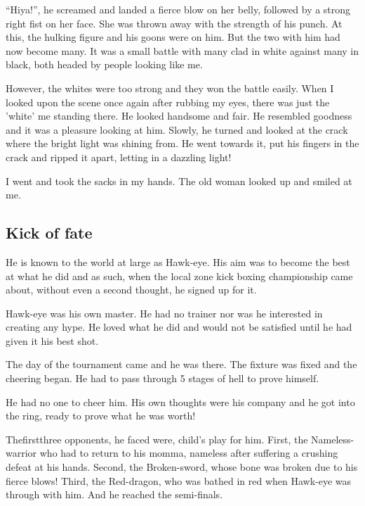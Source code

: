 \documentclass[twoside,11pt]{article}
\begin{document}
``Hiya!'', he screamed and landed a fierce blow on her belly, followed by a strong right fist on her face. She was thrown away with the strength of his punch. At this, the hulking figure and his goons were on him. But the two with him had now become many. It was a small battle with many clad in white against many in black, both headed by people looking like me.

However, the whites were too strong and they won the battle easily. When I looked upon the scene once again after rubbing my eyes, there was just the 'white' me standing there. He looked handsome and fair. He resembled goodness and it was a pleasure looking at him. Slowly, he turned and looked at the crack where the bright light was shining from. He went towards it, put his fingers in the crack and ripped it apart, letting in a dazzling light!

I went and took the sacks in my hands. The old woman looked up and smiled at me.
\newpage

\begin{center}
  \section{Kick of fate}
\end{center}
\bigskip
\bigskip
\bigskip

He is known to the world at large as Hawk-eye. His aim was to become the best at what he did and as such, when the local zone kick boxing championship came about, without even a second thought, he signed up for it.

Hawk-eye was his own master. He had no trainer nor was he interested in creating any hype. He loved what he did and would not be satisfied until he had given it his best shot.

The day of the tournament came and he was there. The fixture was fixed and the cheering began. He had to pass through 5 stages of hell to prove himself.

He had no one to cheer him. His own thoughts were his company and he got into the ring, ready to prove what he was worth!

Thefirstthree opponents, he faced were, child's play for him. First, the Nameless-warrior who had to return to his momma, nameless after suffering a crushing defeat at his hands. Second, the Broken-sword, whose bone was broken due to his fierce blows! Third, the Red-dragon, who was bathed in red when Hawk-eye was through with him. And he reached the semi-finals.
\end{document}
